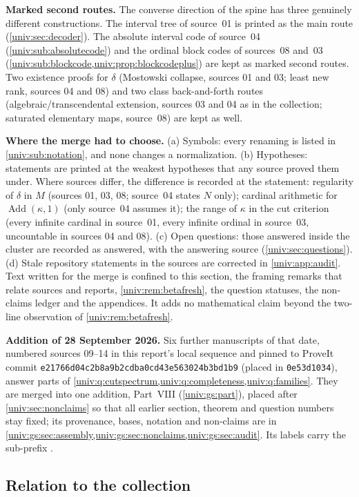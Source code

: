 \documentclass[11pt,letterpaper]{article}
\numberwithin{equation}{section}
\theoremstyle{definition}
\theoremstyle{remark}
\newcommand{\Add}{\operatorname{Add}}
\newcommand{\gsfull}{\texttt{e21766d0\allowbreak 4c2b8a9b\allowbreak 2cdba0cd\allowbreak 43e56302\allowbreak 4b3bd1b9}}
\begin{document}
\textbf{Marked second routes.} The converse direction of the spine has three
genuinely different constructions. The interval tree of source~01 is printed
as the main route (\cref{univ:sec:decoder}). The absolute interval code of
source~04 (\cref{univ:sub:absolutecode}) and the ordinal block codes of
sources~08 and~03 (\cref{univ:sub:blockcode,univ:prop:blockcodeplus}) are kept
as marked second routes. Two existence proofs for $\delta$ (Mostowski
collapse, sources 01 and 03; least new rank, sources 04 and 08) and two
class back-and-forth routes (algebraic/transcendental extension, sources 03
and 04 as in the collection; saturated elementary maps, source~08) are kept as
well.

\textbf{Where the merge had to choose.} (a) Symbols: every renaming is listed
in \cref{univ:sub:notation}, and none changes a normalization. (b)
Hypotheses: statements are printed at the weakest hypotheses that any source
proved them under. Where sources differ, the difference is recorded at the
statement: regularity of $\delta$ in $M$ (sources 01, 03, 08; source~04 states
$N$ only); cardinal arithmetic for $\Add(\kappa,1)$ (only source~04 assumes
it); the range of $\kappa$ in the cut criterion (every infinite cardinal in
source~01, every infinite ordinal in source~03, uncountable in sources 04 and
08). (c) Open questions: those answered inside the cluster are recorded as
answered, with the answering source (\cref{univ:sec:questions}). (d) Stale
repository statements in the sources are corrected in
\cref{univ:app:audit}. Text written for the merge is confined to this section,
the framing remarks that relate sources and reports, \cref{univ:rem:betafresh},
the question statuses, the non-claims ledger and the appendices. It adds no
mathematical claim beyond the two-line observation of
\cref{univ:rem:betafresh}.

\textbf{Addition of 28 September 2026.} Six further manuscripts of that date,
numbered sources 09--14 in this report's local sequence and pinned to ProveIt
commit \gsfull{} (placed in \texttt{0e53d1034}), answer parts of
\cref{univ:q:cutspectrum,univ:q:completeness,univ:q:families}. They are merged
into one addition, Part~VIII (\cref{univ:gs:part}), placed after
\cref{univ:sec:nonclaims} so that all earlier section, theorem and question
numbers stay fixed; its provenance, bases, notation and non-claims are in
\cref{univ:gs:sec:assembly,univ:gs:sec:nonclaims,univ:gs:sec:audit}. Its labels
carry the sub-prefix .

\subsection{Relation to the collection}\label{univ:sub:collection}
\end{document}

